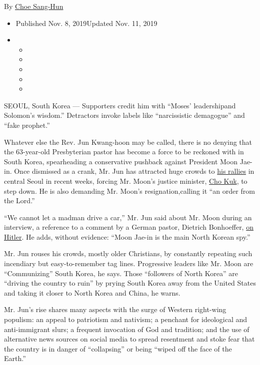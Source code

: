 By \href{https://www.nytimes.com/by/choe-sang-hun}{Choe Sang-Hun}

\begin{itemize}
\item
  Published Nov. 8, 2019Updated Nov. 11, 2019
\item
  \begin{itemize}
  \item
  \item
  \item
  \item
  \item
  \end{itemize}
\end{itemize}

SEOUL, South Korea​ --- Supporters credit him with ``Moses' leadership​
and Solomon's wisdom​.'' Detractors invoke labels like ``narcissistic
demagogue'' and ``fake prophet.''

Whatever else the Rev. Jun Kwang-hoon may be called, there is no denying
that the 63-year-old Presbyterian pastor has become a force to be
reckoned with in South Korea, spearheading a conservative pushback
against President Moon Jae-in. Once dismissed as a crank, Mr. Jun has
attracted huge crowds to
\href{https://www.nytimes.com/2019/10/12/world/asia/south-korea-protests.html?searchResultPosition=4}{his
rallies} in central Seoul in recent weeks, forcing Mr. Moon's justice
minister,
\href{https://www.nytimes.com/2019/10/14/world/asia/south-korea-cho-kuk-resigns.html?searchResultPosition=3}{Cho
Kuk}​, to step down. He is also demanding Mr. Moon's resignation,
​calling it ``an order from the Lord.''

``We cannot let a madman drive a car,'' Mr. Jun said about Mr. Moon
during an interview, a reference to a comment by a German pastor,
Dietrich Bonhoeffer, \href{https://www.azquotes.com/quote/917469}{on
Hitler}. He adds, without evidence: ``Moon Jae-in is the main North
Korean spy.''

Mr. Jun rouses his crowds, mostly older Christians, by constantly
repeating such incendiary but easy-to-remember tag lines. Progressive
leaders like Mr. Moon are ``Communizing'' South Korea, he says. Those
``followers of North Korea'' are ``driving the country to ruin'' by
prying South Korea away from the United States and taking it closer to
North Korea and China​, he warns​.

Mr. Jun's rise shares many aspects with the surge of Western right-wing
populism: an appeal to patriotism and nativism; a penchant for
ideological and anti-immigrant slurs; a frequent invocation of God and
tradition; and the use of alternative news sources on social media to
spread resentment and stoke fear that the country is in danger of
``collapsing'' or being ``wiped off the face of the Earth.''

